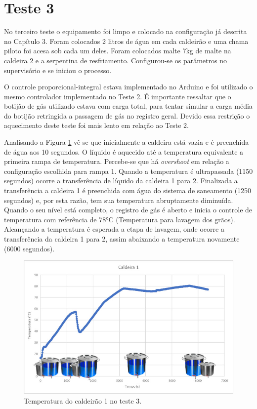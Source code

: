 	\section{Teste 3}
No terceiro teste o equipamento foi limpo e colocado na configuração já descrita no Capítulo 3. Foram colocados 2 litros de água em cada caldeirão e uma chama piloto foi acesa sob cada um deles. Foram colocados malte 7kg de malte na caldeira 2 e a serpentina de resfriamento. Configurou-se os parâmetros no supervisório e se iniciou o processo. 

O controle proporcional-integral estava implementado no Arduino e foi utilizado o mesmo controlador implementado no Teste 2. É importante ressaltar que o botijão de gás utilizado estava com carga total, para tentar simular a carga média do botijão retringida a passagem de gás no registro geral. Devido essa restrição o aquecimento deste teste foi mais lento em relação ao Teste 2.

Analisando a Figura \ref{teste03c1} vê-se que inicialmente a caldeira está vazia e é preenchida de água aos 10 segundos. O líquido é aquecido até a temperatura equivalente a primeira rampa de temperatura. Percebe-se que há \textit{overshoot} em relação a configuração escolhida para rampa 1. Quando a temperatura é ultrapassada (1150 segundos) ocorre a transferência de líquido da caldeira 1 para 2. Finalizada a transferência a caldeira 1 é preenchida com água do sistema de saneamento (1250 segundos) e, por esta razão, tem sua temperatura abruptamente diminuída. Quando o seu nível está completo, o registro de gás é aberto e inicia o controle de temperatura com referência de 78°C (Temperatura para lavagem dos grãos). Alcançando a temperatura é esperada a etapa de lavagem, onde ocorre a transferência da caldeira 1 para 2, assim abaixando a temperatura novamente (6000 segundos).
 
  \begin{figure}[htb]
	\caption{\label{teste03c1}Temperatura do caldeirão 1 no teste 3.}
	\begin{center}
	    \includegraphics[width=0.95\linewidth]{./img/teste03_cald1.jpg}
	\end{center}
\end{figure}

